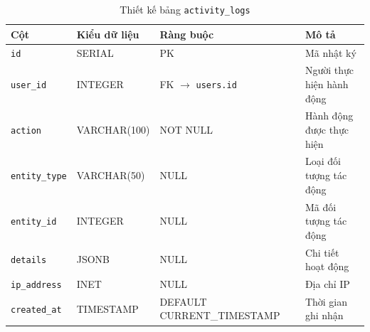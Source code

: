 \begin{table}[H]
\centering
\caption{Thiết kế bảng \texttt{activity\_logs}}
\begin{tabularx}{\textwidth}{|l|l|Z|Z|}
\hline
\textbf{Cột} &
\textbf{Kiểu dữ liệu} &
\textbf{Ràng buộc} &
\textbf{Mô tả} \\ \hline

\texttt{id}
& SERIAL
& PK
& Mã nhật ký \\ \hline

\texttt{user\_id}
& INTEGER
& FK $\rightarrow$ \texttt{users.id}
& Người thực hiện hành động \\ \hline

\texttt{action}
& VARCHAR(100)
& NOT NULL
& Hành động được thực hiện \\ \hline

\texttt{entity\_type}
& VARCHAR(50)
& NULL
& Loại đối tượng tác động \\ \hline

\texttt{entity\_id}
& INTEGER
& NULL
& Mã đối tượng tác động \\ \hline

\texttt{details}
& JSONB
& NULL
& Chi tiết hoạt động \\ \hline

\texttt{ip\_address}
& INET
& NULL
& Địa chỉ IP \\ \hline

\texttt{created\_at}
& TIMESTAMP
& DEFAULT CURRENT\_TIMESTAMP
& Thời gian ghi nhận \\ \hline

\end{tabularx}
\end{table}
\fi